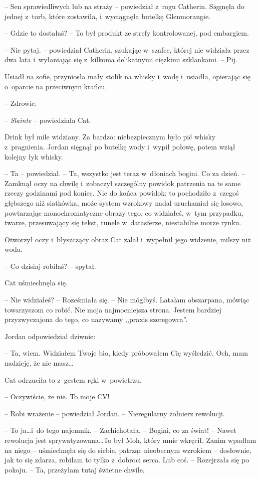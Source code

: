 \documentclass[oneside,polish,11pt,sfheadings]{mwbk}
\begin{document}
-- Sen sprawiedliwych lub na straży -- powiedział z~rogu Catherin.
Sięgnęła do jednej z~torb, które zostawiła, i~wyciągnęła butelkę
Glenmorangie.

-- Gdzie to dostałaś? -- To był produkt ze strefy kontrolowanej, pod
embargiem.

-- Nie pytaj. -- powiedział Catherin, szukając w~szafce, której nie
widziała przez dwa lata i~wyłaniając się z~kilkoma delikatnymi ciężkimi
szklankami. -- Pij.

Usiadł na sofie, przyniosła mały stolik na whisky i~wodę i~usiadła,
opierając się o~oparcie na przeciwnym krańcu.

-- Zdrowie.

-- \emph{Slainte} -- powiedziała Cat.

Drink był mile widziany. Za bardzo: niebezpiecznym było pić whisky z~pragnienia. Jordan sięgnął po butelkę wody i~wypił połowę, potem wziął
kolejny łyk whisky.

-- Ta -- powiedział. -- Ta, wszystko jest teraz w~dłoniach bogini. Co za
dzień. -- Zamknął oczy na chwilę i~zobaczył szczególny powidok patrzenia
na te same rzeczy godzinami pod koniec. Nie do końca powidok: to
pochodziło z~czegoś głębszego niż siatkówka, może system wzrokowy nadal
uruchamiał się losowo, powtarzając monochromatyczne obrazy tego, co
widziałeś, w~tym przypadku, twarze, przesuwający się tekst, tunele w~datasferze, niestabilne morze rynku.

Otworzył oczy i~błyszczący obraz Cat zalał i~wypełnił jego widzenie,
milszy niż woda.

-- Co dzisiaj robiłaś? -- spytał.

Cat uśmiechnęła się. 

-- Nie widziałeś? -- Roześmiała się. -- Nie mógłbyś.
Latałam obszarpana, mówiąc towarzyszom co robić. Nie moja najmocniejsza
strona. Jestem bardziej przyzwyczajona do tego, co nazywamy ,,praxis
szeregowca''.

Jordan odpowiedział dziwnie: 

-- Ta, wiem. Widziałem Twoje bio, kiedy
próbowałem Cię wyśledzić. Och, mam nadzieję, że nie masz\ldots

Cat odrzuciła to z~gestem ręki w~powietrzu. 

-- Oczywiście, że nie. To
moje CV!

-- Robi wrażenie -- powiedział Jordan. -- Nieregularny żołnierz rewolucji.

-- To ja\ldots i~do tego najemnik. -- Zachichotała. -- Bogini, co za świat! -- Nawet rewolucja jest sprywatyzowana\ldots To był Moh, który mnie wkręcił.
Zanim wpadłam na niego -- uśmiechnęła się do siebie, patrząc nieobecnym
wzrokiem -- dosłownie, jak to się zdarza, robiłam to tylko z~dobroci
serca. Lub coś. -- Rozejrzała się po pokoju. -- Ta, przeżyłam tutaj
świetne chwile.
\end{document}

